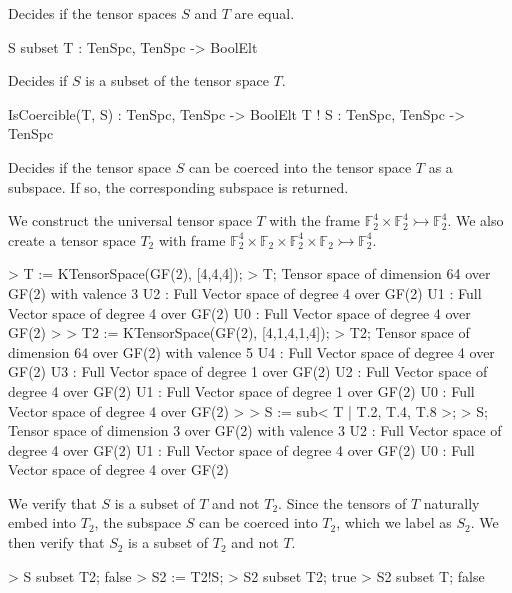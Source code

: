 Decides if the tensor spaces $S$ and $T$ are equal.

\begin{intrinsics}
S subset T : TenSpc, TenSpc -> BoolElt
\end{intrinsics}

Decides if $S$ is a subset of the tensor space $T$.

\begin{intrinsics}
IsCoercible(T, S) : TenSpc, TenSpc -> BoolElt
T ! S : TenSpc, TenSpc -> TenSpc
\end{intrinsics}

Decides if the tensor space $S$ can be coerced into the tensor space $T$ as a subspace. If so, the corresponding subspace is returned. 

\begin{example}[TenSpcContainment]

We construct the universal tensor space $T$ with the frame $\mathbb{F}_2^4\times \mathbb{F}_2^4\rightarrowtail \mathbb{F}_2^4$. 
We also create a tensor space $T_2$ with frame $\mathbb{F}_2^4\times \mathbb{F}_2\times \mathbb{F}_2^4\times\mathbb{F}_2\rightarrowtail \mathbb{F}_2^4$.

\begin{code}
> T := KTensorSpace(GF(2), [4,4,4]);
> T;
Tensor space of dimension 64 over GF(2) with valence 3
U2 : Full Vector space of degree 4 over GF(2)
U1 : Full Vector space of degree 4 over GF(2)
U0 : Full Vector space of degree 4 over GF(2)
> 
> T2 := KTensorSpace(GF(2), [4,1,4,1,4]);
> T2;
Tensor space of dimension 64 over GF(2) with valence 5
U4 : Full Vector space of degree 4 over GF(2)
U3 : Full Vector space of degree 1 over GF(2)
U2 : Full Vector space of degree 4 over GF(2)
U1 : Full Vector space of degree 1 over GF(2)
U0 : Full Vector space of degree 4 over GF(2)
> 
> S := sub< T | T.2, T.4, T.8 >;
> S;
Tensor space of dimension 3 over GF(2) with valence 3
U2 : Full Vector space of degree 4 over GF(2)
U1 : Full Vector space of degree 4 over GF(2)
U0 : Full Vector space of degree 4 over GF(2)
\end{code}

We verify that $S$ is a subset of $T$ and not $T_2$. 
Since the tensors of $T$ naturally embed into $T_2$, the subspace $S$ can be coerced into $T_2$, which we label as $S_2$. 
We then verify that $S_2$ is a subset of $T_2$ and not $T$. 
\begin{code}
> S subset T2;
false
> S2 := T2!S;
> S2 subset T2;
true
> S2 subset T;
false
\end{code}
\end{example}

